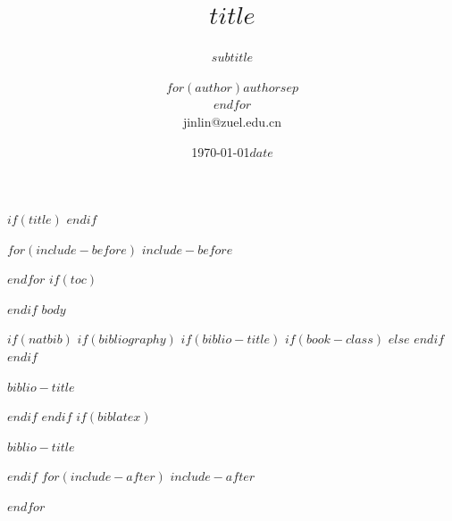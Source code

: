 \documentclass[$if(fontsize)$$fontsize$,$endif$$if(lang)$$babel-lang$,$endif$$if(handout)$handout,$endif$$if(beamer)$ignorenonframetext,11pt,xcolor=dvipsnames,aspectratio=43,hyperref={bookmarksdepth=4}$endif$$for(classoption)$$classoption$$sep$,$endfor$]{$documentclass$}
\author[$for(author)$$author$$sep$ \\ $endfor$]{\CJKfamily{kai}$for(author)$$author$$sep$ \\ $endfor$ \\ jinlin@zuel.edu.cn \\}
\institute[$for(institute)$$institute$$sep$ \and $endfor$]{\CJKfamily{kai}$for(institute)$$institute$$sep$ \and $endfor$}
\date{\today}
\date{$date$}
\title{$title$}
\subtitle{$subtitle$}
\newif\ifbibliography
\renewcommand{\refname}{参考文献}            %
\begin{document}
$if(title)$
\frame{\titlepage}
$endif$

$for(include-before)$
$include-before$

$endfor$
$if(toc)$
\begin{frame}
\tableofcontents[hideallsubsections]
\end{frame}

$endif$
$body$

$if(natbib)$
$if(bibliography)$
$if(biblio-title)$
$if(book-class)$
\renewcommand\bibname{$biblio-title$}
$else$
\renewcommand\refname{$biblio-title$}
$endif$
$endif$
\begin{frame}[allowframebreaks]{$biblio-title$}
\bibliographytrue

\end{frame}

$endif$
$endif$
$if(biblatex)$
\begin{frame}[allowframebreaks]{$biblio-title$}
\bibliographytrue
\printbibliography[heading=none]
\end{frame}

$endif$
$for(include-after)$
$include-after$

$endfor$
\end{document}
